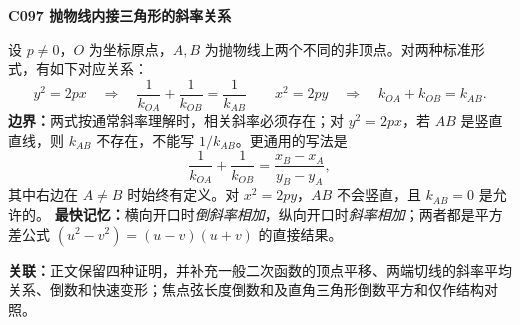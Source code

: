 \noindent\textbf{C097 抛物线内接三角形的斜率关系}\par
\noindent 设 $p\ne0$，$O$ 为坐标原点，$A,B$ 为抛物线上两个不同的非顶点。对两种标准形式，有如下对应关系：
\[
\boxed{y^2=2px\quad\Longrightarrow\quad
\frac1{k_{OA}}+\frac1{k_{OB}}=\frac1{k_{AB}}}\qquad
\boxed{x^2=2py\quad\Longrightarrow\quad
k_{OA}+k_{OB}=k_{AB}}.
\]
\noindent\textbf{边界：}两式按通常斜率理解时，相关斜率必须存在；对 $y^2=2px$，若 $AB$ 是竖直直线，则 $k_{AB}$ 不存在，不能写 $1/k_{AB}$。更通用的写法是
\[
\frac1{k_{OA}}+\frac1{k_{OB}}=\frac{x_B-x_A}{y_B-y_A},
\]
其中右边在 $A\ne B$ 时始终有定义。对 $x^2=2py$，$AB$ 不会竖直，且 $k_{AB}=0$ 是允许的。
\noindent\textbf{最快记忆：}横向开口时\emph{倒斜率相加}，纵向开口时\emph{斜率相加}；两者都是平方差公式 $(u^2-v^2)=(u-v)(u+v)$ 的直接结果。\par
\noindent\textbf{关联：}正文保留四种证明，并补充一般二次函数的顶点平移、两端切线的斜率平均关系、倒数和快速变形；焦点弦长度倒数和及直角三角形倒数平方和仅作结构对照。\par
